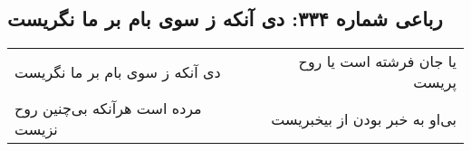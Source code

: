 \begin{center}
\section*{رباعی شماره ۳۳۴: دی آنکه ز سوی بام بر ما نگریست}
\label{sec:0334}
\begin{longtable}{l p{0.5cm} r}
دی آنکه ز سوی بام بر ما نگریست
&&
یا جان فرشته است یا روح پریست
\\
مرده است هرآنکه بی‌چنین روح نزیست
&&
بی‌او به خبر بودن از بیخبریست
\\
\end{longtable}
\end{center}
